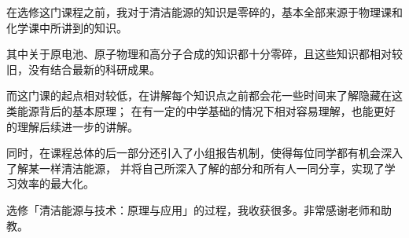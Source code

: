 
\begin{summary}

在选修这门课程之前，我对于清洁能源的知识是零碎的，基本全部来源于物理课和化学课中所讲到的知识。

其中关于原电池、原子物理和高分子合成的知识都十分零碎，且这些知识都相对较旧，没有结合最新的科研成果。

而这门课的起点相对较低，在讲解每个知识点之前都会花一些时间来了解隐藏在这类能源背后的基本原理；
在有一定的中学基础的情况下相对容易理解，也能更好的理解后续进一步的讲解。

同时，在课程总体的后一部分还引入了小组报告机制，使得每位同学都有机会深入了解某一样清洁能源，
并将自己所深入了解的部分和所有人一同分享，实现了学习效率的最大化。

选修「清洁能源与技术：原理与应用」的过程，我收获很多。非常感谢老师和助教。

\end{summary}
